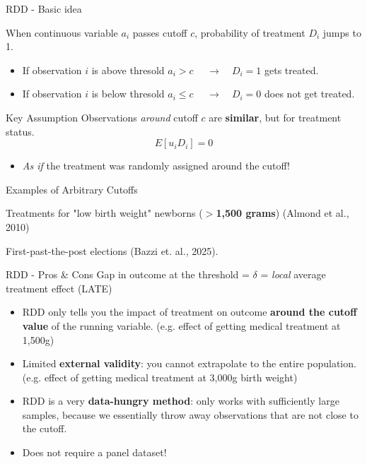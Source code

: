 \documentclass[9pt,aspectratio=169, xcolor=dvipsnames]{beamer}
\begin{document}
\begin{frame}{RDD - Basic idea}
\linespread{1.3}\selectfont %

When continuous variable $a_i$ passes cutoff $c$, probability of treatment $D_{i}$ jumps to 1.
		\begin{itemize}
				\item If observation $i$ is above thresold $a_{i} > c$ $\quad \rightarrow \quad D_i =1$ gets treated.
				\item If observation $i$ is below thresold $a_{i} \leq c$ $\quad \rightarrow \quad D_i =0$ does not get treated.
		\end{itemize}
		\pause
		\begin{block}{Key Assumption}
			\vspace{0.2cm}
			Observations \textit{around} cutoff $c$ are \textbf{similar}, but for treatment status.
			$$
			E[u_{i} D_i] = 0
			$$
			\vspace{-1cm}
			\begin{itemize}
			\item[$\rightarrow$] \textit{As if} the treatment was randomly assigned around the cutoff! 
			\end{itemize}
		\end{block}
		\pause 
		\begin{block}{Examples of Arbitrary Cutoffs}
			\begin{itemize} \footnotesize{
				\item Treatments for "low birth weight" newborns (\textbf{$>$1,500 grams}) \footnotesize{(Almond et al., 2010)}
				\item First-past-the-post elections (Bazzi et. al., 2025).}
			\end{itemize}
		\end{block}
\end{frame}

\begin{frame}{RDD - Pros \& Cons}
				Gap in outcome at the threshold  = $\delta$ = \textit{local} average treatment effect (LATE)
				\medskip 
		\pause
		\begin{itemize}
			\item RDD only tells you the impact of treatment on outcome \textbf{around the cutoff value} of the running variable. \color{gray}(e.g. effect of getting medical treatment at 1,500g) \color{black}
			\item	Limited \textbf{external validity}: you cannot extrapolate to the entire population. \color{gray}(e.g. effect of getting medical treatment at 3,000g birth weight) \color{black}
			\item	RDD is a very \textbf{data-hungry method}: only works with sufficiently large samples, because we essentially throw away observations that are not close to the cutoff.	
			\pause
			\item[$\rightarrow$] Does not require a panel dataset! 
		\end{itemize}
\end{frame}
\end{document}
